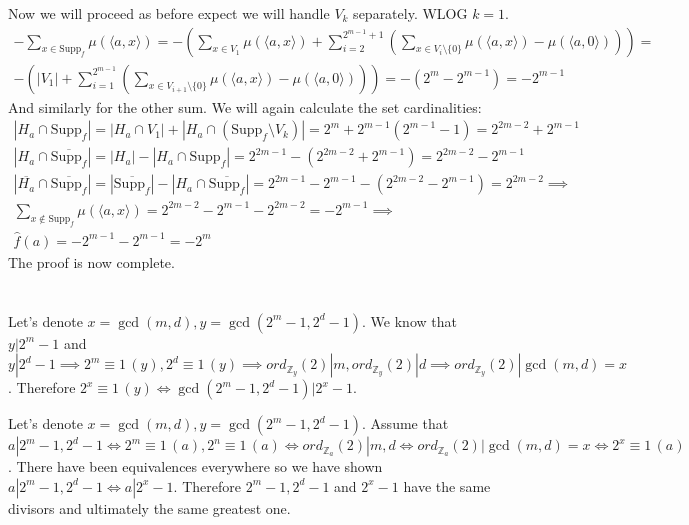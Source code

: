 \documentclass[12pt, a4paper]{article}
\begin{document}
Now we will proceed as before expect we will handle $V_k$ separately. WLOG $k = 1$. 
\begin{gather*}
-\sum\limits_{x \in \text{Supp}_f} \mu(\langle a,x \rangle) = -(\sum\limits_{x \in V_1}\mu(\langle a,x \rangle) + \sum\limits_{i = 2}^{2^{m-1}+1} \left( \sum\limits_{x \in V_i \setminus\{0\}} \mu(\langle a,x \rangle) - \mu(\langle a,0 \rangle) \right)) = \\
-(|V_1| + \sum\limits_{i = 1}^{2^{m-1}} \left( \sum\limits_{x \in V_{i+1} \setminus\{0\}} \mu(\langle a,x \rangle) - \mu(\langle a,0 \rangle) \right)) = -(2^m - 2^{m-1}) = -2^{m-1}
\end{gather*}
And similarly for the other sum. We will again calculate the set cardinalities:
\begin{gather*}
|H_a \cap \text{Supp}_f| = |H_a \cap V_1 | + |H_a \cap (\text{Supp}_f \setminus V_k)| = 2^m + 2^{m-1}(2^{m-1}-1) = 2^{2m-2}+2^{m-1}\\
|H_a \cap \overline{\text{Supp}_f}| = |H_a|-|H_a \cap \text{Supp}_f| = 2^{2m-1} - (2^{2m-2}+2^{m-1}) = 2^{2m-2}-2^{m-1}\\
|\overline{H_a} \cap \overline{\text{Supp}_f}| = |\overline{\text{Supp}_f}|-|H_a \cap \overline{\text{Supp}_f}| = 2^{2m-1}-2^{m-1}-(2^{2m-2}-2^{m-1}) = 2^{2m-2}\implies\\
\sum\limits_{x \notin \text{Supp}_f} \mu(\langle a,x \rangle) =  2^{2m-2}-2^{m-1} - 2^{2m-2} = -2^{m-1} \implies\\
\hat{f}(a) = -2^{m-1} - 2^{m-1} = -2^m
\end{gather*}
The proof is now complete.


\section{}
Let's denote $x = \gcd(m,d), y = \gcd(2^m-1, 2^d-1)$. We know that $y | 2^m-1$ and $y | 2^d-1 \implies 2^m \equiv 1 \, (y), 2^d \equiv 1 \, (y) \implies ord_{\mathbb{Z}_y}(2)|m, ord_{\mathbb{Z}_y}(2)|d \implies ord_{\mathbb{Z}_y}(2)|\gcd(m,d)=x$. Therefore $2^x \equiv 1 \, (y) \iff \gcd(2^m-1, 2^d-1) | 2^x-1$.

Let's denote $x = \gcd(m,d), y = \gcd(2^m-1, 2^d-1)$. Assume that $a | 2^m-1, 2^d-1 \iff 2^m \equiv 1 \, (a), 2^n \equiv 1 \, (a) \iff ord_{\mathbb{Z}_a}(2)|m,d \iff ord_{\mathbb{Z}_a}(2)|\gcd(m,d)=x \iff 2^x \equiv 1 \, (a)$. There have been equivalences everywhere so we have shown $a | 2^m-1, 2^d-1 \iff a | 2^x-1$. Therefore $ 2^m-1, 2^d-1$ and $2^x-1$ have the same divisors and ultimately the same greatest one.
\end{document}

